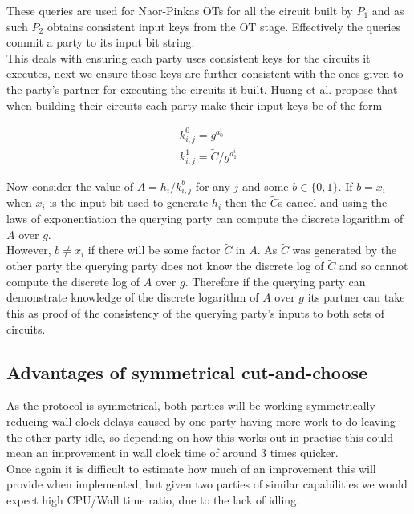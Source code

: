 \documentclass[ %
                    author={Nicholas Tutte},
                supervisor={Prof. Nigel Smart},
                    degree={MEng},
                     title={Secure Two Party Computation},
                  subtitle={A practical comparison of recent protocols},
                      type={Research - GG1K},
                      year={2015} ]{dissertation}
\begin{document}
				These queries are used for Naor-Pinkas OTs for all the circuit built by $P_1$ and as such $P_2$ obtains consistent input keys from the OT stage. Effectively the queries commit a party to its input bit string.\\

				This deals with ensuring each party uses consistent keys for the circuits it executes, next we ensure those keys are further consistent with the ones given to the party's partner for executing the circuits it built. Huang et al. propose that when building their circuits each party make their input keys be of the form
				
				$$
				\begin{matrix}
					k_{i,j}^0 = g^{a_0^i}\\
					k_{i,j}^1 = \tilde C / g^{a_1^i}
				\end{matrix}
				$$

				Now consider the value of $A = h_i / k_{i,j}^{b}$ for any $j$ and some $b \in \{0, 1\}$. If $b = x_i$ when $x_i$ is the input bit used to generate $h_i$ then the $\tilde C$s cancel and using the laws of exponentiation the querying party can compute the discrete logarithm of $A$ over $g$.\\

				However, $b \neq x_i$ if there will be some factor $\tilde C$ in $A$. As $\tilde C$ was generated by the other party the querying party does not know the discrete log of $\tilde C$ and so cannot compute the discrete log of $A$ over $g$. Therefore if the querying party can demonstrate knowledge of the discrete logarithm of $A$ over $g$ its partner can take this as proof of the consistency of the querying party's inputs to both sets of circuits.

			\subsection{Advantages of symmetrical cut-and-choose}
				As the protocol is symmetrical, both parties will be working symmetrically reducing wall clock delays caused by one party having more work to do leaving the other party idle, so depending on how this works out in practise this could mean an improvement in wall clock time of around $3$ times quicker.\\

				Once again it is difficult to estimate how much of an improvement this will provide when implemented, but given two parties of similar capabilities we would expect high CPU/Wall time ratio, due to the lack of idling.
\end{document}
